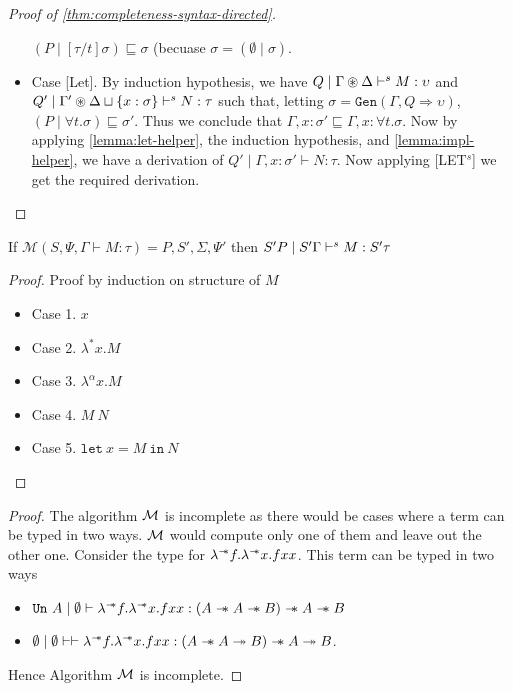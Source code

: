 \begin{proof}[Proof of \cref{thm:completeness-syntax-directed}]
\begin{itemize}
    $(P \mid [\tau / t]\sigma) \sqsubseteq \sigma$ (becuase $\sigma = (\emptyset \mid \sigma)$.
  \item{Case [Let].}
    {\color{red}
      By induction hypothesis, we have $Q \mid \Gamma \circledast \Delta \vdash^s M: \upsilon$ and $Q' \mid \Gamma' \circledast \Delta \sqcup \{x:\sigma\} \vdash^s N:\tau$
      such that, letting $\sigma = \texttt{Gen}(\Gamma, Q \Rightarrow \upsilon)$, $(P \mid \forall t. \sigma) \sqsubseteq \sigma'$. Thus we conclude that
      $\Gamma, x:\sigma' \sqsubseteq \Gamma, x:\forall t. \sigma$. Now by applying \cref{lemma:let-helper}, the induction hypothesis, and \cref{lemma:impl-helper},
      we have a derivation of $Q' \mid \Gamma, x:\sigma' \vdash N:\tau$. Now applying [LET$^s$] we get the required derivation.
    } \qedhere
  \end{itemize}
\end{proof}


\begin{theorem}\label{thm:soundness-m}
   If $\mathcal{M}(S, \Psi, \Gamma \vdash M : \tau) = P, S', \Sigma, \Psi'$ then $S' P \mid S' \Gamma \vdash^s M : S' \tau$
\end{theorem}
\begin{proof}
  Proof by induction on structure of $M$
  \begin{itemize}
  \item Case 1. $x$
  \item Case 2. $\lambda^{*} x. M$
  \item Case 3. $\lambda ^{\alpha}x. M$
  \item Case 4. $M\ N$
  \item Case 5. $\texttt{let}\ x = M\ \texttt{in}\ N$
  \end{itemize}
\end{proof}


\begin{theorem}[Incompleteness of $\M$.]
\end{theorem}
\begin{proof}
  The algorithm $\M$ is incomplete as there would be cases where a term can be typed in two ways. $\M$ would compute only one of them and leave out the other one.
  Consider the type for $\lambda^{\mathrel{-\mkern-6mu*}}f. \lambda^{\mathrel{-\mkern-6mu*}}x. f x x$.
  This term can be typed in two ways
  \begin{itemize}
  \item $\texttt{Un}\ A \mid \emptyset \vdash \lambda^{\sepimp}f. \lambda^{\sepimp}x. f x x: (A \sepimp A \sepimp B) \sepimp A \sepimp B$
  \item $\emptyset \mid \emptyset \vdash \vdash \lambda^{\mathrel{-\mkern-6mu*}}f. \lambda^{\mathrel{-\mkern-6mu*}}x. f x x: (A \mathrel{-\mkern-6mu*} A \twoheadrightarrow B) \mathrel{-\mkern-6mu*} A \twoheadrightarrow B$.
\end{itemize}

  Hence Algorithm $\M$ is incomplete.
\end{proof}

